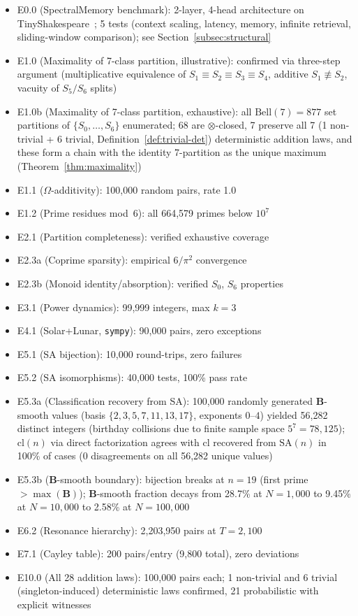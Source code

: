 \documentclass[10pt,twocolumn]{article}
\newcommand{\cl}{\mathrm{cl}}
\newcommand{\SA}{\mathrm{SA}}
\newcommand{\Om}{\Omega}
\newcommand{\B}{\mathbf{B}}
\begin{document}
\begin{itemize}[noitemsep, topsep=2pt]
\item E0.0 (SpectralMemory benchmark): 2-layer, 4-head architecture on
      TinyShakespeare~\cite{Karpathy2015CharRNN}; 5 tests (context scaling, latency, memory,
      infinite retrieval, sliding-window comparison); see Section~\ref{subsec:structural}
\item E1.0 (Maximality of 7-class partition, illustrative): confirmed
      via three-step argument (multiplicative equivalence of
      $S_1{\equiv}S_2{\equiv}S_3{\equiv}S_4$, additive
      $S_1 \not\equiv S_2$, vacuity of $S_5/S_6$ splits)
\item E1.0b (Maximality of 7-class partition, exhaustive): all
      $\mathrm{Bell}(7){=}877$ set partitions of
      $\{S_0,\dots,S_6\}$ enumerated; 68 are
      $\otimes$-closed, 7 preserve all 7 (1 non-trivial + 6 trivial,
      Definition~\ref{def:trivial-det}) deterministic addition laws,
      and these form a chain with the identity 7-partition as the
      unique maximum (Theorem~\ref{thm:maximality})
\item E1.1 ($\Om$-additivity): 100{,}000 random pairs, rate 1.0
\item E1.2 (Prime residues mod~6): all 664{,}579 primes below $10^7$
\item E2.1 (Partition completeness): verified exhaustive coverage
\item E2.3a (Coprime sparsity): empirical $6/\pi^2$ convergence
\item E2.3b (Monoid identity/absorption): verified $S_0$, $S_6$ properties
\item E3.1 (Power dynamics): 99{,}999 integers, max $k=3$
\item E4.1 (Solar+Lunar, \texttt{sympy}): 90{,}000 pairs, zero exceptions
\item E5.1 (SA bijection): 10{,}000 round-trips, zero failures
\item E5.2 (SA isomorphisms): 40{,}000 tests, 100\% pass rate
\item E5.3a (Classification recovery from SA): 100{,}000 randomly
      generated $\B$-smooth values (basis $\{2,3,5,7,11,13,17\}$,
      exponents $0$--$4$) yielded 56{,}282 distinct integers
      (birthday collisions due to finite sample space $5^7{=}78{,}125$);
      $\cl(n)$ via direct factorization agrees with $\cl$ recovered from
      $\SA(n)$ in 100\% of cases (0 disagreements on all 56{,}282
      unique values)
\item E5.3b ($\B$-smooth boundary): bijection breaks at $n=19$
      (first prime ${>}\max(\B)$); $\B$-smooth fraction decays from
      28.7\% at $N{=}1{,}000$ to 9.45\% at $N{=}10{,}000$ to 2.58\%
      at $N{=}100{,}000$
\item E6.2 (Resonance hierarchy): 2{,}203{,}950 pairs at $T=2{,}100$
\item E7.1 (Cayley table): 200 pairs/entry (9{,}800 total), zero deviations
\item E10.0 (All 28 addition laws): 100{,}000 pairs each; 1 non-trivial
      and 6 trivial (singleton-induced) deterministic laws confirmed,
      21 probabilistic with explicit witnesses
\end{itemize}
\end{document}
